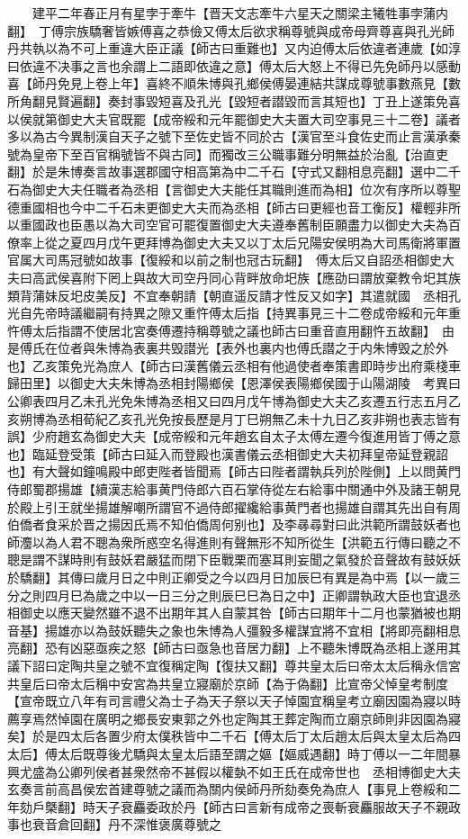 　　建平二年春正月有星孛于牽牛【晋天文志牽牛六星天之關梁主犧牲事孛蒲内翻】　丁傅宗族驕奢皆嫉傅喜之恭儉又傅太后欲求稱尊號與成帝母齊尊喜與孔光師丹共執以為不可上重違大臣正議【師古曰重難也】又内迫傅太后依違者連歲【如淳曰依違不决事之言也余謂上二語即依違之意】傅太后大怒上不得已先免師丹以感動喜【師丹免見上卷上年】喜終不順朱博與孔鄉侯傅晏連結共謀成尊號事數燕見【數所角翻見賢遍翻】奏封事毀短喜及孔光【毀短者譛毀而言其短也】丁丑上遂策免喜以侯就第御史大夫官既罷【成帝綏和元年罷御史大夫置大司空事見三十二卷】議者多以為古今異制漢自天子之號下至佐史皆不同於古【漢官至斗食佐史而止言漢承秦號為皇帝下至百官稱號皆不與古同】而獨改三公職事難分明無益於治亂【治直吏翻】於是朱博奏言故事選郡國守相高第為中二千石【守式又翻相息亮翻】選中二千石為御史大夫任職者為丞相【言御史大夫能任其職則進而為相】位次有序所以尊聖德重國相也今中二千石未更御史大夫而為丞相【師古曰更經也音工衡反】權輕非所以重國政也臣愚以為大司空官可罷復置御史大夫遵奉舊制臣願盡力以御史大夫為百僚率上從之夏四月戊午更拜博為御史大夫又以丁太后兄陽安侯明為大司馬衛將軍置官属大司馬冠號如故事【復綏和以前之制也冠古玩翻】　傅太后又自詔丞相御史大夫曰高武侯喜附下罔上與故大司空丹同心背畔放命圯族【應劭曰謂放棄教令圯其族類背蒲妹反圯皮美反】不宜奉朝請【朝直遥反請才性反又如字】其遣就國　丞相孔光自先帝時議繼嗣有持異之隙又重忤傅太后指【持異事見三十二卷成帝綏和元年重忤傅太后指謂不使居北宮奏傅遷持稱尊號之議也師古曰重音直用翻忤五故翻】　由是傅氏在位者與朱博為表裏共毁譛光【表外也裏内也傅氏譛之于内朱博毁之於外也】乙亥策免光為庶人【師古曰漢舊儀云丞相有他過使者奉策書即時步出府乘棧車歸田里】以御史大夫朱博為丞相封陽鄉侯【恩澤侯表陽鄉侯國于山陽湖陵　考異曰公卿表四月乙未孔光免朱博為丞相又曰四月戊午博為御史大夫乙亥遷五行志五月乙亥朔博為丞相荀紀乙亥孔光免按長歷是月丁巳朔無乙未十九日乙亥非朔也表志皆有誤】少府趙玄為御史大夫【成帝綏和元年趙玄自太子太傅左遷今復進用皆丁傅之意也】臨延登受策【師古曰延入而登殿也漢書儀云丞相御史大夫初拜皇帝延登親詔也】有大聲如鐘鳴殿中郎吏陛者皆聞焉【師古曰陛者謂執兵列於陛側】上以問黄門侍郎蜀郡揚雄【續漢志給事黄門侍郎六百石掌侍從左右給事中關通中外及諸王朝見於殿上引王就坐揚雄解嘲所謂官不過侍郎擢纔給事黄門者也揚雄自謂其先出自有周伯僑者食采於晋之揚因氏焉不知伯僑周何别也】及李㝷尋對曰此洪範所謂鼓妖者也師灋以為人君不聰為衆所惑空名得進則有聲無形不知所從生【洪範五行傳曰聽之不聰是謂不謀時則有鼓妖君嚴猛而閉下臣戰栗而塞耳則妄聞之氣發於音聲故有鼓妖妖於驕翻】其傳曰歲月日之中則正卿受之今以四月日加辰巳有異是為中焉【以一歲三分之則四月巳為歲之中以一日三分之則辰巳巳為日之中】正卿謂執政大臣也宜退丞相御史以應天變然雖不退不出期年其人自蒙其咎【師古曰期年十二月也蒙猶被也期音基】揚雄亦以為鼓妖聽失之象也朱博為人彊毅多權謀宜將不宜相【將即亮翻相息亮翻】恐有凶惡亟疾之怒【師古曰亟急也音居力翻】上不聽朱博既為丞相上遂用其議下詔曰定陶共皇之號不宜復稱定陶【復扶又翻】尊共皇太后曰帝太太后稱永信宮共皇后曰帝太后稱中安宮為共皇立寢廟於京師【為于偽翻】比宣帝父悼皇考制度【宣帝既立八年有司言禮父為士子為天子祭以天子悼園宜稱皇考立廟因園為寢以時薦享焉然悼園在廣明之鄉長安東郭之外也定陶其王葬定陶而立廟京師則非因園為寢矣】於是四太后各置少府太僕秩皆中二千石【傅太后丁太后趙太后與太皇太后為四太后】傅太后既尊後尤驕與太皇太后語至謂之嫗【嫗威遇翻】時丁傅以一二年間暴興尤盛為公卿列侯者甚衆然帝不甚假以權埶不如王氏在成帝世也　丞相博御史大夫玄奏言前高昌侯宏首建尊號之議而為關内侯師丹所劾奏免為庶人【事見上卷綏和二年劾戶槩翻】時天子衰麤委政於丹【師古曰言新有成帝之喪斬衰麤服故天子不親政事也衰音倉回翻】丹不深惟褒廣尊號之